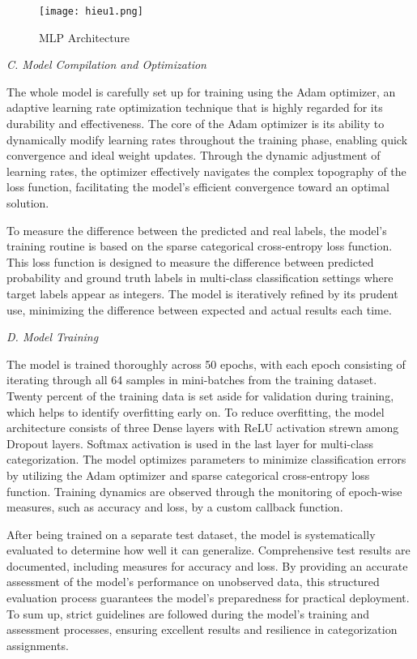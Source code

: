 \documentclass[conference]{IEEEtran}
\begin{document}
\begin{figure}[h]
    \centering
    \texttt{[image: hieu1.png]}
    \caption{MLP Architecture}
    \label{fig1:hieu1.png}
\end{figure}

\textit{C. Model Compilation and Optimization}

\hspace{1em}The whole model is carefully set up for training using the Adam optimizer, an adaptive learning rate optimization technique that is highly regarded for its durability and effectiveness. The core of the Adam optimizer is its ability to dynamically modify learning rates throughout the training phase, enabling quick convergence and ideal weight updates. Through the dynamic adjustment of learning rates, the optimizer effectively navigates the complex topography of the loss function, facilitating the model's efficient convergence toward an optimal solution.

\hspace{1em}To measure the difference between the predicted and real labels, the model's training routine is based on the sparse categorical cross-entropy loss function. This loss function is designed to measure the difference between predicted probability and ground truth labels in multi-class classification settings where target labels appear as integers. The model is iteratively refined by its prudent use, minimizing the difference between expected and actual results each time.


\textit{D. Model Training}

\hspace{1em}The model is trained thoroughly across 50 epochs, with each epoch consisting of iterating through all 64 samples in mini-batches from the training dataset. Twenty percent of the training data is set aside for validation during training, which helps to identify overfitting early on. To reduce overfitting, the model architecture consists of three Dense layers with ReLU activation strewn among Dropout layers. Softmax activation is used in the last layer for multi-class categorization. The model optimizes parameters to minimize classification errors by utilizing the Adam optimizer and sparse categorical cross-entropy loss function. Training dynamics are observed through the monitoring of epoch-wise measures, such as accuracy and loss, by a custom callback function.

\hspace{1em}After being trained on a separate test dataset, the model is systematically evaluated to determine how well it can generalize. Comprehensive test results are documented, including measures for accuracy and loss. By providing an accurate assessment of the model's performance on unobserved data, this structured evaluation process guarantees the model's preparedness for practical deployment. To sum up, strict guidelines are followed during the model's training and assessment processes, ensuring excellent results and resilience in categorization assignments.
\end{document}
